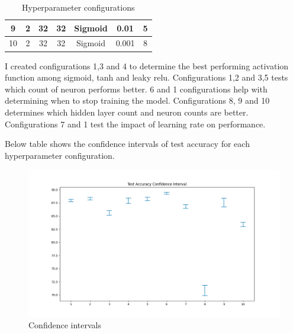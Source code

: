 \documentclass[12pt,a4paper, margin=1in]{article}
\begin{document}
\begin{table}[h]
\begin{tabular}{|c|c|c|c|c|c|c|}
    9           & 2                                                                 & 32                                                                             & 32                                                                             & Sigmoid                                                                & 0.01                                                              & 5               \\ \hline
    10          & 2                                                                 & 32                                                                             & 32                                                                             & Sigmoid                                                                & 0.001                                                             & 8               \\ \hline
    \end{tabular}
    \centering
    \caption{Hyperparameter configurations}
\end{table}

\bigskip

I created configurations 1,3 and 4 to determine the best performing activation function among sigmoid, tanh and leaky relu. Configurations 1,2 and 3,5 tests which count of neuron performs better. 6 and 1 configurations help with determining when to stop training the model. Configurations 8, 9 and 10 determines which hidden layer count and neuron counts are better.
Configurations 7 and 1 test the impact of learning rate on performance.
\pagebreak

Below table shows the confidence intervals of test accuracy for each hyperparameter configuration.

\begin{figure}[h]
    \includegraphics[scale=0.65]{srm_plot.png}
    \centering
    \caption{Confidence intervals}
\end{figure}
\bigskip
\end{document}
